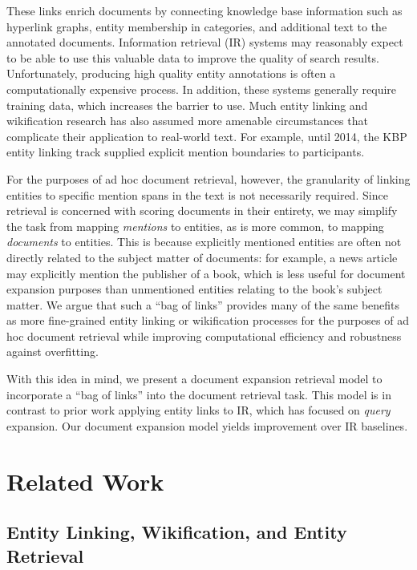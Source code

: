 \documentclass{sig-alternate}
\begin{document}
These links enrich documents by connecting knowledge base information such as hyperlink graphs, entity membership in categories, and additional text to the annotated documents. Information retrieval (IR) systems may reasonably expect to be able to use this valuable data to improve the quality of search results. Unfortunately, producing high quality entity annotations is often a computationally expensive process. In addition, these systems generally require training data, which increases the barrier to use. Much entity linking and wikification research has also assumed more amenable circumstances that complicate their application to real-world text. For example, until 2014, the KBP entity linking track supplied explicit mention boundaries to participants.

For the purposes of ad hoc document retrieval, however, the granularity of linking entities to specific mention spans in the text is not necessarily required. Since retrieval is concerned with scoring documents in their entirety, we may simplify the task from mapping \textit{mentions} to entities, as is more common, to mapping \textit{documents} to entities. This is because explicitly mentioned entities are often not directly related to the subject matter of documents: for example, a news article may explicitly mention the publisher of a book, which is less useful for document expansion purposes than unmentioned entities relating to the book's subject matter. We argue that such a ``bag of links'' provides many of the same benefits as more fine-grained entity linking or wikification processes for the purposes of ad hoc document retrieval while improving computational efficiency and robustness against overfitting. 

With this idea in mind, we present a document expansion retrieval model to incorporate a ``bag of links'' into the document retrieval task. This model is in contrast to prior work applying entity links to IR, which has focused on \textit{query} expansion. Our document expansion model yields improvement over IR baselines.

\section{Related Work}\label{section.related}

\subsection{Entity Linking, Wikification, and Entity Retrieval}\label{section.related.entities}
\end{document}
